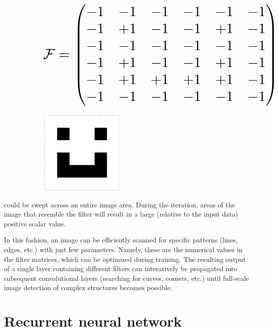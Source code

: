 \begin{figure}[H]
	\centering
	\begin{subfigure}[h]{0.45\linewidth}
		\begin{equation*}
			\resizebox{\hsize}{!}{\ensuremath{
				\mathcal{F} = 
				\begin{pmatrix}
				-1 & -1 & -1 & -1 & -1 & -1 \\
				-1 & +1 & -1 & -1 & +1 & -1 \\
				-1 & -1 & -1 & -1 & -1 & -1 \\
				-1 & +1 & -1 & -1 & +1 & -1 \\
				-1 & +1 & +1 & +1 & +1 & -1 \\
				-1 & -1 & -1 & -1 & -1 & -1
				\end{pmatrix}
			}}
		\end{equation*}
	\end{subfigure}
	\hfill
	\begin{subfigure}[h]{0.45\linewidth}
	\includegraphics[height=4.2cm]{imgs/convolution.png}
	\end{subfigure}
\end{figure}


could be swept across an entire image area. During the iteration, areas of the image that resemble the filter will result in a large (relative to the input data)
positive scalar value.

In this fashion, an image can be efficiently scanned for specific patterns (lines, edges, etc.) with just few parameters. Namely, these are the numerical
values in the filter matrices, which can be optimized during training. The resulting output of a single layer containing different filters can interatively 
be propagated into subsequent convolutional layers (searching for curves, corners, etc.) until full-scale image detection of complex structures becomes possible.

\section{Recurrent neural network}
\label{sec:RNN}

